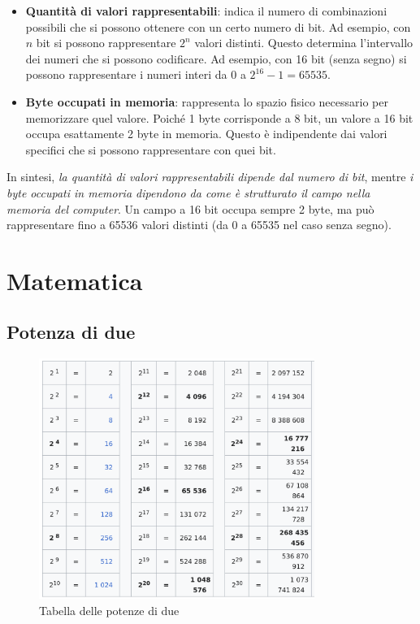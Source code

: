 \begin{itemize}
  \item \textbf{Quantità di valori rappresentabili}: indica il numero di combinazioni possibili che si possono ottenere con un certo numero di bit. Ad esempio, con $n$ bit si possono rappresentare $2^n$ valori distinti. Questo determina l'intervallo dei numeri che si possono codificare. Ad esempio, con 16 bit (senza segno) si possono rappresentare i numeri interi da $0$ a $2^{16}-1 = 65535$.

  \item \textbf{Byte occupati in memoria}: rappresenta lo spazio fisico necessario per memorizzare quel valore. Poiché 1 byte corrisponde a 8 bit, un valore a 16 bit occupa esattamente 2 byte in memoria. Questo è indipendente dai valori specifici che si possono rappresentare con quei bit.
\end{itemize}

\noindent In sintesi, \emph{la quantità di valori rappresentabili dipende dal numero di bit}, mentre \emph{i byte occupati in memoria dipendono da come è strutturato il campo nella memoria del computer}. Un campo a 16 bit occupa sempre 2 byte, ma può rappresentare fino a 65536 valori distinti (da 0 a 65535 nel caso senza segno).



\section{Matematica}
\subsection{Potenza di due}
\begin{figure}[h!]
    \centering
    \includegraphics[width=0.8\textwidth]{images/potenza_due}
    \caption{Tabella delle potenze di due}
    \label{fig:potenza_due}
\end{figure}
\newpage
